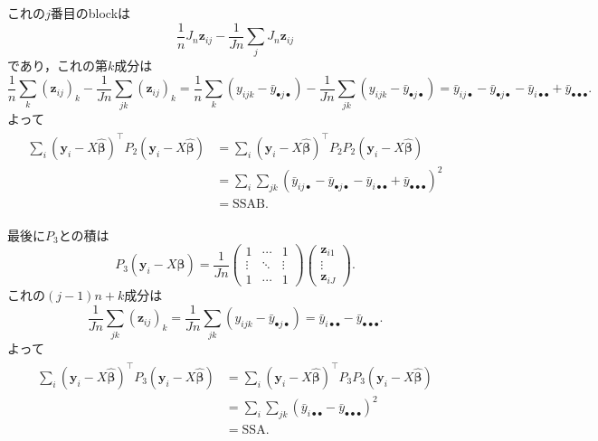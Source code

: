 これの\(j\)番目のblockは
\[ \frac{1}{n} J_n \boldsymbol{z}_{ij} - \frac{1}{Jn} \sum_j J_n \boldsymbol{z}_{ij} \]
であり，これの第\(k\)成分は
\[
\frac{1}{n} \sum_k (\boldsymbol{z}_{ij})_k - \frac{1}{Jn} \sum_{jk} (\boldsymbol{z}_{ij})_k
= \frac{1}{n} \sum_k (y_{ijk} - \bar{y}_{\bullet j\bullet}) - \frac{1}{Jn} \sum_{jk} (y_{ijk} - \bar{y}_{\bullet j\bullet})
= \bar{y}_{ij\bullet} - \bar{y}_{\bullet j\bullet} - \bar{y}_{i\bullet\bullet} + \bar{y}_{\bullet\bullet\bullet} .
\]
よって
\begin{align}
  \begin{split}
    \sum_i (\boldsymbol{y}_i - X \hat{\boldsymbol\beta})^\top P_2 (\boldsymbol{y}_i - X \hat{\boldsymbol\beta})
    &= \sum_i(\boldsymbol{y}_i - X \hat{\boldsymbol\beta})^\top P_2 P_2 (\boldsymbol{y}_i - X \hat{\boldsymbol\beta}) \\
    &= \sum_i \sum_{jk} (\bar{y}_{ij\bullet} - \bar{y}_{\bullet j\bullet} - \bar{y}_{i\bullet\bullet} + \bar{y}_{\bullet\bullet\bullet})^2 \\
    &= \text{SSAB} .
  \end{split}
  \label{12_49_p2_ssab}
\end{align}

最後に\(P_3\)との積は
\[
  P_3 (\boldsymbol{y}_i - X \hat{\boldsymbol\beta})
  = \frac{1}{Jn}
  \begin{pmatrix}
    1 & \cdots & 1 \\
    \vdots & \ddots & \vdots \\
    1 & \cdots & 1
  \end{pmatrix}
  \begin{pmatrix}
    \boldsymbol{z}_{i1} \\ \vdots \\  \boldsymbol{z}_{iJ}
  \end{pmatrix}
  .
\]
これの\((j-1)n+k\)成分は
\[
\frac{1}{Jn} \sum_{jk} (\boldsymbol{z}_{ij})_k
= \frac{1}{Jn} \sum_{jk} (y_{ijk} - \bar{y}_{\bullet j \bullet})
= \bar{y}_{i\bullet\bullet} - \bar{y}_{\bullet\bullet\bullet} .
\]
よって
\begin{align}
  \begin{split}
    \sum_i (\boldsymbol{y}_i - X \hat{\boldsymbol\beta})^\top P_3 (\boldsymbol{y}_i - X \hat{\boldsymbol\beta})
    &= \sum_i(\boldsymbol{y}_i - X \hat{\boldsymbol\beta})^\top P_3 P_3 (\boldsymbol{y}_i - X \hat{\boldsymbol\beta}) \\
    &= \sum_i \sum_{jk} (\bar{y}_{i\bullet\bullet} - \bar{y}_{\bullet\bullet\bullet})^2 \\
    &= \text{SSA} .
  \end{split}
  \label{12_49_p3_ssa}
\end{align}

